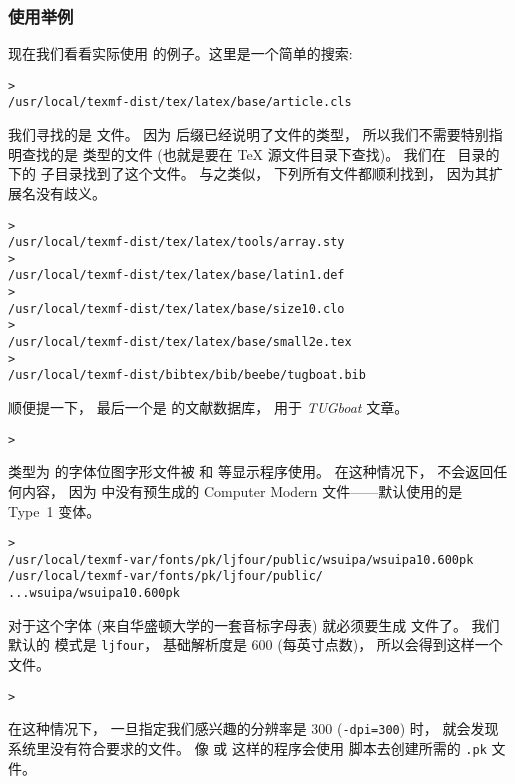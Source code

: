 \documentclass{article}
\begin{document}
\subsubsection{使用举例}
\label{sec:examples-of-use}

现在我们看看实际使用 \KPS{} 的例子。这里是一个简单的搜索: 

\begin{alltt}
> 
   /usr/local/texmf-dist/tex/latex/base/article.cls
\end{alltt}
我们寻找的是  文件。
因为  后缀已经说明了文件的类型，
所以我们不需要特别指明查找的是  类型的文件 (也就是要在 \TeX{} 源文件目录下查找)。
我们在 \TL\ 目录的  下的  子目录找到了这个文件。
与之类似，
下列所有文件都顺利找到，
因为其扩展名没有歧义。
\begin{alltt}
> 
   /usr/local/texmf-dist/tex/latex/tools/array.sty
> 
   /usr/local/texmf-dist/tex/latex/base/latin1.def
> 
   /usr/local/texmf-dist/tex/latex/base/size10.clo
> 
   /usr/local/texmf-dist/tex/latex/base/small2e.tex
> 
   /usr/local/texmf-dist/bibtex/bib/beebe/tugboat.bib
\end{alltt}

顺便提一下，
最后一个是 \BibTeX{} 的文献数据库，
用于 \textsl{TUGboat} 文章。

\begin{alltt}
> 
\end{alltt}
类型为  的字体位图字形文件被  和  等显示程序使用。
在这种情况下，
不会返回任何内容，
因为 \TL{} 中没有预生成的 Computer Modern  文件——默认使用的是 Type~1 变体。
\begin{alltt}
> 
\ifSingleColumn   /usr/local/texmf-var/fonts/pk/ljfour/public/wsuipa/wsuipa10.600pk
\else /usr/local/texmf-var/fonts/pk/ljfour/public/
...                         wsuipa/wsuipa10.600pk
\fi\end{alltt}
对于这个字体 (来自华盛顿大学的一套音标字母表) 就必须要生成  文件了。
我们默认的 \MF{} 模式是 \texttt{ljfour}，
基础解析度是 600\dpi{} (每英寸点数)，
所以会得到这样一个文件。
\begin{alltt}
> 
\end{alltt}
在这种情况下，
一旦指定我们感兴趣的分辨率是 300\dpi{} (\texttt{-dpi=300}) 时，
就会发现系统里没有符合要求的文件。
像  或  这样的程序会使用  脚本去创建所需的 \texttt{.pk} 文件。
\end{document}
